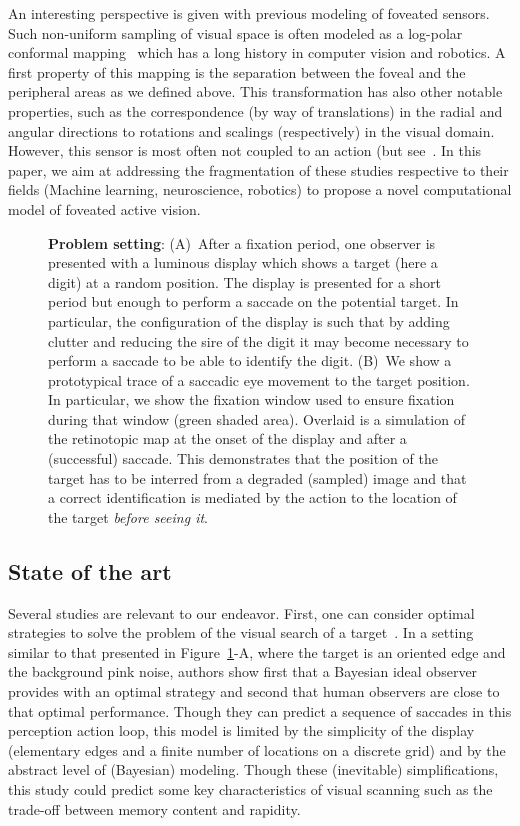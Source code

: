 An interesting perspective is given with previous modeling of foveated sensors. Such non-uniform sampling of visual space is often modeled as a log-polar conformal mapping~\citep{Traver10} which has a long history in computer vision and robotics. A first property of this mapping is the separation between the foveal and the peripheral areas as we defined above. This transformation has also other notable properties, such as the correspondence (by way of translations) in the radial and angular directions to rotations and scalings (respectively) in the visual domain. However, this sensor is most often not coupled to an action (but see~\citep{ref needed)}. In this paper, we aim at addressing the fragmentation of these studies respective to their fields (Machine learning, neuroscience, robotics) to propose a novel computational model of foveated active vision.
\begin{figure}%
\caption{
{\bf Problem setting}:
(A)~After a fixation period, one observer is presented with a luminous display which shows a target (here a digit) at a random position. The display is presented for a short period but enough to perform a saccade on the potential target. In particular, the configuration of the display is such that by adding clutter and reducing the sire of the digit it may become necessary to perform a saccade to be able to identify the digit. %
(B)~We show a prototypical trace of a saccadic eye movement to the target position. In particular, we show the fixation window used to ensure fixation during that window (green shaded area). Overlaid is a simulation of the retinotopic map at the onset of the display and after a (successful) saccade. This demonstrates that the position of the target has to be interred from a degraded (sampled) image and that a correct identification is mediated by the action to the location of the target \emph{before seeing it}.
\label{fig:intro}}%
\end{figure}%
%
\subsection{State of the art}
%
Several studies are relevant to our endeavor. First, one can consider optimal strategies to solve the problem of the visual search of a target~\citep{Najemnik05}. In a setting similar to that presented in Figure~\ref{fig:intro}-A, where the target is an oriented edge and the background pink noise, authors show first that a Bayesian ideal observer provides with an optimal strategy and second that human observers are close to that optimal performance. Though they can predict a sequence of saccades in this perception action loop, this model is limited by the simplicity of the display (elementary edges and a finite number of locations on a discrete grid) and by the abstract level of (Bayesian) modeling. Though these (inevitable) simplifications, this study could predict some key characteristics of visual scanning such as the trade-off between memory content and rapidity.


